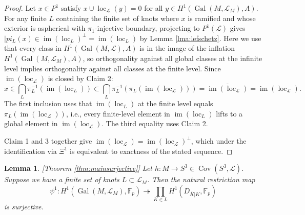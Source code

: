 \documentclass{amsart}
\theoremstyle{plain}
\theoremstyle{definition}
\theoremstyle{plain}
\theoremstyle{plain}
\theoremstyle{plain}
\newtheorem{lemma}[theorem]{Lemma}
\theoremstyle{remark}
\theoremstyle{remark}
\theoremstyle{plain}
\theoremstyle{definition}
\theoremstyle{plain}
\DeclareMathOperator{\Gal}{\mathrm{Gal}}
\DeclareMathOperator{\Cov}{\mathrm{Cov}}
\DeclareMathOperator{\loc}{\mathrm{loc}}
\DeclareMathOperator{\im}{\mathrm{im}}
\newcounter{main}
\theoremstyle{plain}
\theoremstyle{plain}
\numberwithin{equation}{section}
\begin{document}
\begin{proof}
Let $x \in P^1$ satisfy $x \cup \loc_{\mathcal{L}}(y) = 0$ for all $y \in H^1(\Gal(M, \mathcal{L}_M), A)$. For any finite $L$ containing the finite set of knots where $x$ is ramified and whose exterior is aspherical with $\pi_1$-injective boundary, projecting to $P^1(\mathcal L)$ gives $|pi_L(x) \in \im(\loc_L)^\perp = \im(\loc_L)$ by Lemma \ref{lma:lefschetz}. Here we use that every class in $H^1(\Gal(M, \mathcal L), A)$ is in the image of the inflation $H^1(\Gal(M, \mathcal L_M), A)$, so orthogonality against all global classes at the infinite level implies orthogonality against all classes at the finite level.
Since $\im(\loc_{\mathcal{L}})$ is closed by Claim 2:
\begin{equation}
    x \in \bigcap_L\pi_L^{-1}(\im(\loc_L)) \subset \bigcap_L\pi_L^{-1}(\pi_L(\im(\loc_{\mathcal{L}}))) = \overline{\im(\loc_{\mathcal{L}})} = \im(\loc_{\mathcal{L}}).
\end{equation}
The first inclusion uses that $\im(\loc_L)$ at the finite level equals $\pi_L(\im(\loc_{\mathcal{L}}))$, i.e., every finite-level element in $\im(\loc_L)$ lifts to a global element in $\im(\loc_{\mathcal{L}})$. The third equality uses Claim 2.

\medskip

Claim 1 and 3 together give $\im(\loc_{\mathcal{L}}) = \im(\loc_{\mathcal{L}})^\perp$, which under the identification via $\Xi^1$ is equivalent to exactness of the stated sequence.
\end{proof}


\begin{lemma}\label{lma:surjective}[Theorem \ref{thm:mainsurjective}]
Let $h: M \to S^3 \in \Cov(S^3, \mathcal{L})$. Suppose we have a finite set of knots $L \subset \mathcal{L}_M$. Then the natural restriction map
\begin{equation}
   \psi^1: H^1(\Gal(M, \mathcal{L}_M), \mathbb{F}_p) \twoheadrightarrow \prod_{K \in L}H^1(D_{\overline{K}|K}, \mathbb{F}_p)
\end{equation}
is surjective.
\end{lemma}
\end{document}
